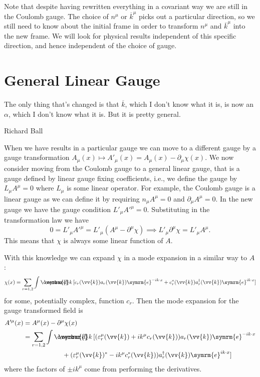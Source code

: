 \documentclass[fleqn]{NotesClass}
\newcommand{\e}{\symrm{e}}
\newcommand{\hermit}{{\dagger}}
\newcommand{\dbar}[1][0.0]{\ThisStyle{\ensurestackMath{%
            \stackengine{#1\LMex}{\SavedStyle \symrm{d}}{\SavedStyle\overbar{}%
                \mkern2.25mu}{O}{r}{F}{F}{L}}}}
\newcommand{\invariantmeasure}[1]{%
    \mathchoice{\dbar #1}{\dbar #1}{\dbar[.05] #1}{\dbar[.06] #1}
}
\begin{document}
    Note that despite having rewritten everything in a covariant way we are still in the Coulomb gauge.
    The choice of \(n^\mu\) or \(\overbar{k}^\mu\) picks out a particular direction, so we still need to know about the initial frame in order to transform \(n^\mu\) and \(\overbar{k}^\mu\) into the new frame.
    We will look for physical results independent of this specific direction, and hence independent of the choice of gauge.
    
    \section{General Linear Gauge}
    \epigraph{The only thing that's changed is that \(\overbar{k}\), which I don't know what it is, is now an \(\alpha\), which I don't know what it is. But it is pretty general.}{Richard Ball}
    When we have results in a particular gauge we can move to a different gauge by a gauge transformation \(A_\mu(x) \mapsto A'_\mu(x) = A_\mu(x) - \partial_\mu \chi(x)\).
    We now consider moving from the Coulomb gauge to a general linear gauge, that is a gauge defined by linear gauge fixing coefficients, i.e., we define the gauge by \(L_\mu A^\mu = 0\) where \(L_\mu\) is some linear operator.
    For example, the Coulomb gauge is a linear gauge as we can define it by requiring \(n_\mu A^\mu = 0\) and \(\partial_\mu A^\mu = 0\).
    In the new gauge we have the gauge condition \(L'_\mu A'^\mu = 0\).
    Substituting in the transformation law we have
    \begin{equation}
        0 = L'_\mu A'^\mu = L'_\mu (A^\mu - \partial^\mu \chi) \implies L'_\mu \partial^\mu \chi = L'_\mu A^\mu.
    \end{equation}
    This means that \(\chi\) is always some linear function of \(A\).
    
    With this knowledge we can expand \(\chi\) in a mode expansion in a similar way to \(A\):
    \begin{equation}
        \chi(x) = \sum_{r=1,2} \int \invariantmeasure{k} \, [c_r(\vv{k}) a_r(\vv{k}) \e^{-ik\cdot x} + c_r^*(\vv{k}) a_r^\hermit(\vv{k}) \e^{ik \cdot x}]
    \end{equation}
    for some, potentially complex, function \(c_r\).
    Then the mode expansion for the gauge transformed field is
    \begin{align}
        A'^\mu(x) &= A^\mu(x) - \partial^\mu\chi(x)\\
        &= \sum_{r=1,2} \int \invariantmeasure{k} \, [(\varepsilon_r^\mu(\vv{k}) + ik^\mu c_r(\vv{k}))a_r(\vv{k}) \e^{-ik\cdot x}\\
        &\qquad \qquad \qquad + (\varepsilon_r^\mu(\vv{k})^* - ik^\mu c_r^*(\vv{k})) a_r^\hermit(\vv{k}) \e^{ik \cdot x}]
    \end{align}
    where the factors of \(\pm ik^\mu\) come from performing the derivatives.
    
\end{document}
